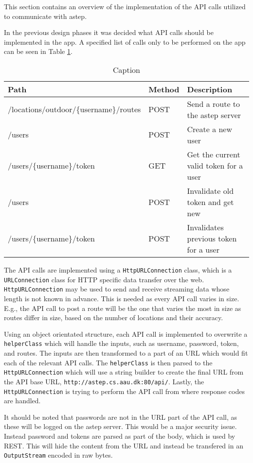 This section contains an overview of the implementation of the API calls utilized to communicate with \gls{astep}.

In the previous design phases it was decided what API calls should be implemented in the app.
A specified list of calls only to be performed on the app can be seen in Table \ref{tab:asteprequests}.

\begin{table}[h]
	\centering
	\scriptsize
	\begin{tabular}{l l l}
		Path & Method & Description\\\midrule
		/locations/outdoor/\{username\}/routes & POST & Send a route to the \gls{astep} server\\
		/users & POST & Create a new user\\
		/users/\{username\}/token & GET & Get the current valid token for a user\\
		/users & POST & Invalidate old token and get new\\
		/users/\{username\}/token & POST & Invalidates previous token for a user\\
	\end{tabular}
	\caption{Caption}
	\label{tab:asteprequests}
\end{table} 

The API calls are implemented using a \texttt{HttpURLConnection} class, which is a \texttt{URLConnection} class for HTTP specific data transfer over the web.
\texttt{HttpURLConnection} may be used to send and receive streaming data whose length is not known in advance.
This is needed as every API call varies in size.
E.g., the API call to post a route will be the one that varies the most in size as routes differ in size, based on the number of locations and their accuracy.


Using an object orientated structure, each API call is implemented to overwrite a \texttt{helperClass} which will handle the inputs, such as username, password, token, and routes.
The inputs are then transformed to a part of an URL which would fit each of the relevant API calls.
The \texttt{helperClass} is then parsed to the \texttt{HttpURLConnection} which will use a string builder to create the final URL from the API base URL, \texttt{http://astep.cs.aau.dk:80/api/}.
Lastly, the \texttt{HttpURLConnection} is trying to perform the API call from where response codes are handled.

It should be noted that passwords are not in the URL part of the API call, as these will be logged on the \gls{astep} server. 
This would be a major security issue.
Instead password and tokens are parsed as part of the body, which is used by REST. 
This will hide the content from the URL and instead be transfered in an \texttt{OutputStream} encoded in raw bytes. 

